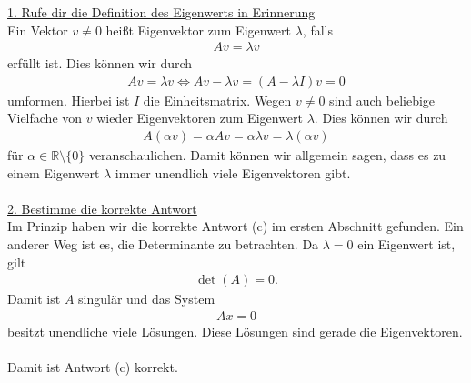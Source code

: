 \underline{1. Rufe dir die Definition des Eigenwerts in Erinnerung}\\
Ein Vektor $v \neq 0$ heißt Eigenvektor zum Eigenwert $\lambda$, falls
\begin{align*}
Av = \lambda v
\end{align*}
erfüllt ist.
Dies können wir durch
\begin{align*}
Av = \lambda v 
\Leftrightarrow
Av - \lambda v = (A - \lambda I) v = 0
\end{align*}
umformen.
Hierbei ist $I$ die Einheitsmatrix.
Wegen $v \neq 0 $ sind auch beliebige Vielfache von $v$ wieder Eigenvektoren zum Eigenwert $\lambda$.
Dies können wir durch
\begin{align*}
A (\alpha v ) 
= 
\alpha Av 
= \alpha \lambda v
= \lambda (\alpha v) 
\end{align*}
für $\alpha \in \mathbb{R} \setminus \lbrace 0 \rbrace$ veranschaulichen.
Damit können wir allgemein sagen, dass es zu einem Eigenwert $\lambda$ immer unendlich viele Eigenvektoren gibt.\\
\\

\underline{2. Bestimme die korrekte Antwort}\\
Im Prinzip haben wir die korrekte Antwort (c) im ersten Abschnitt gefunden.
Ein anderer Weg ist es, die Determinante zu betrachten.
Da $\lambda = 0 $ ein Eigenwert ist, gilt
\begin{align*}
\det(A) = 0.
\end{align*}
Damit ist $A$ singulär und das System
\begin{align*}
A x = 0
\end{align*}
besitzt unendliche viele Lösungen.
Diese Lösungen sind gerade die Eigenvektoren.\\
\\
Damit ist Antwort (c) korrekt.

\newpage
